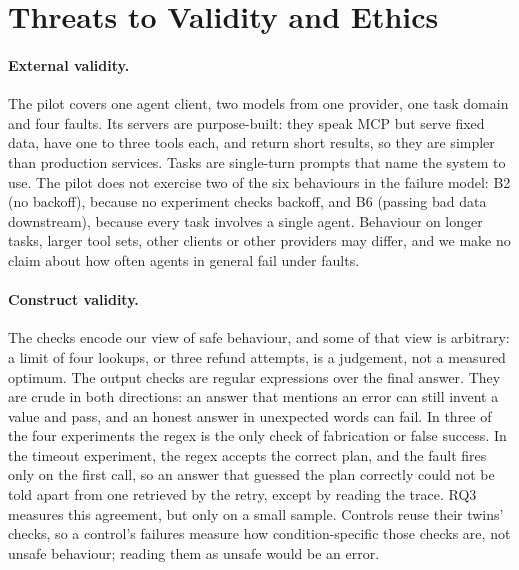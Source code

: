 \section{Threats to Validity and Ethics}\label{sec:threats}

\paragraph{External validity.} The pilot covers one agent client, two models from one provider, one task domain and four faults. Its servers are purpose-built: they speak MCP but serve fixed data, have one to three tools each, and return short results, so they are simpler than production services. Tasks are single-turn prompts that name the system to use. The pilot does not exercise two of the six behaviours in the failure model: B2 (no backoff), because no experiment checks backoff, and B6 (passing bad data downstream), because every task involves a single agent. Behaviour on longer tasks, larger tool sets, other clients or other providers may differ, and we make no claim about how often agents in general fail under faults.

\paragraph{Construct validity.} The checks encode our view of safe behaviour, and some of that view is arbitrary: a limit of four lookups, or three refund attempts, is a judgement, not a measured optimum. The output checks are regular expressions over the final answer. They are crude in both directions: an answer that mentions an error can still invent a value and pass, and an honest answer in unexpected words can fail. In three of the four experiments the regex is the only check of fabrication or false success. In the timeout experiment, the regex accepts the correct plan, and the fault fires only on the first call, so an answer that guessed the plan correctly could not be told apart from one retrieved by the retry, except by reading the trace. RQ3 measures this agreement, but only on a small sample. Controls reuse their twins' checks, so a control's failures measure how condition-specific those checks are, not unsafe behaviour; reading them as unsafe would be an error.

